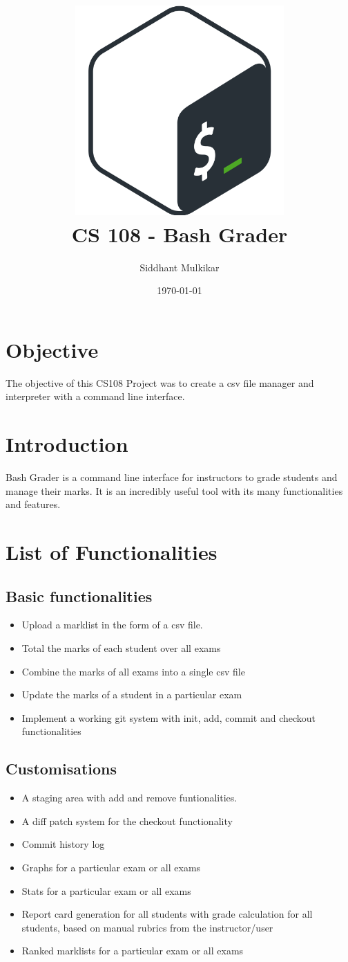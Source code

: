 \documentclass{article}
\title{\includegraphics[width=8cm]{bashlogo.png} \\[2cm] CS 108 - Bash Grader}
\author{Siddhant Mulkikar}
\date{\today}
\begin{document}
\maketitle
\newpage
\tableofcontents
\newpage

\section{Objective}
The objective of this CS108 Project was to create a csv file manager and interpreter with a command line interface.

\section{Introduction}
Bash Grader is a command line interface for instructors to grade students and manage their marks. It is an incredibly useful tool with its many functionalities and features. 

\section{List of Functionalities}
\subsection{Basic functionalities}
\begin{itemize}
    \item Upload a marklist in the form of a csv file.
    \item Total the marks of each student over all exams
    \item Combine the marks of all exams into a single csv file
    \item Update the marks of a student in a particular exam
    \item Implement a working git system with init, add, commit and checkout functionalities
\end{itemize}
\subsection{Customisations}
\begin{itemize}
    \item A staging area with add and remove funtionalities.
    \item A diff patch system for the checkout functionality
    \item Commit history log
    \item Graphs for a particular exam or all exams
    \item Stats for a particular exam or all exams
    \item Report card generation for all students with grade calculation for all students, based on manual rubrics from the instructor/user
    \item Ranked marklists for a particular exam or all exams
\end{itemize}
\newpage
\end{document}
